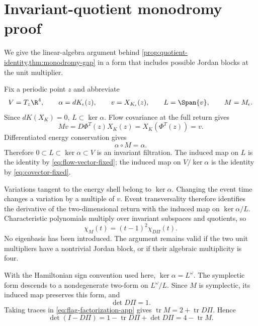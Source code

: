 \section{Invariant-quotient monodromy proof}
\label{app:monodromy}

We give the linear-algebra argument behind
\cref{prop:quotient-identity,thm:monodromy-gap} in a form that includes
possible Jordan blocks at the unit multiplier.

Fix a periodic point \(z\) and abbreviate
\begin{equation}
 V=T_z\R^4,
 \qquad \alpha=dK_\epsilon(z),
 \qquad v=X_{K_\epsilon}(z),
 \qquad L=\Span\{v\},
 \qquad M=M_\epsilon.
 \label{eq:flag-notation}
\end{equation}
Since \(dK(X_K)=0\), \(L\subset\ker\alpha\).  Flow covariance at the full
return gives
\begin{equation}
 Mv=D\Phi^{T}(z)X_K(z)=X_K(\Phi^T(z))=v.
 \label{eq:flow-vector-fixed}
\end{equation}
Differentiated energy conservation gives
\begin{equation}
 \alpha\circ M=\alpha.
 \label{eq:covector-fixed}
\end{equation}
Therefore \(0\subset L\subset\ker\alpha\subset V\) is an invariant
filtration.  The induced map on \(L\) is the identity by
\cref{eq:flow-vector-fixed}; the induced map on
\(V/\ker\alpha\) is the identity by \cref{eq:covector-fixed}.

Variations tangent to the energy shell belong to \(\ker\alpha\).  Changing
the event time changes a variation by a multiple of \(v\).  Event
transversality therefore identifies the derivative of the two-dimensional
return with the induced map on \(\ker\alpha/L\).  Characteristic
polynomials multiply over invariant subspaces and quotients, so
\begin{equation}
 \chi_M(t)=(t-1)^2\chi_{D\Pi}(t).
 \label{eq:flag-factorization-app}
\end{equation}
No eigenbasis has been introduced.  The argument remains valid if the two
unit multipliers have a nontrivial Jordan block, or if their algebraic
multiplicity is four.

With the Hamiltonian sign convention used here, \(\ker\alpha=L^\omega\).
The symplectic form descends to a nondegenerate two-form on
\(L^\omega/L\).  Since \(M\) is symplectic, its induced map preserves this
form, and
\begin{equation}
 \det D\Pi=1.
 \label{eq:return-area}
\end{equation}
Taking traces in \cref{eq:flag-factorization-app} gives
\(\operatorname{tr}M=2+\operatorname{tr}D\Pi\).  Hence
\begin{equation}
 \det(I-D\Pi)
 =1-\operatorname{tr}D\Pi+\det D\Pi
 =4-\operatorname{tr}M.
 \label{eq:det-identity-app}
\end{equation}


